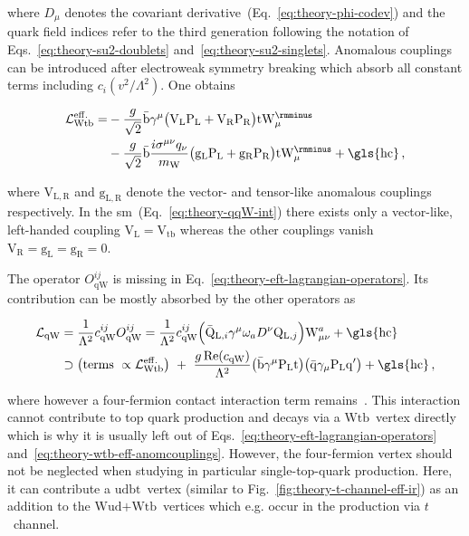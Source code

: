 where $D_\mu$ denotes the covariant derivative~(Eq.~\ref{eq:theory-phi-codev}) and the quark field indices refer to the third generation following the notation of Eqs.~\ref{eq:theory-su2-doublets} and~\ref{eq:theory-su2-singlets}. Anomalous couplings can be introduced after electroweak symmetry breaking which absorb all constant terms including $c_{i}(v^2/\Lambda^2)$. One obtains

\begin{align}
\mathcal{L}^\mathrm{eff.}_\mathrm{Wtb}=&-\frac{g}{\sqrt{2}}\bar{\mathrm{b}}\gamma^{\mu}\big(\mathrm{V}_\mathrm{L}\mathrm{P}_\mathrm{L}+\mathrm{V}_\mathrm{R}\mathrm{P}_\mathrm{R}\big)\mathrm{t}\mathrm{W}_\mu^{\rmminus}\nonumber\\
&-\frac{g}{\sqrt{2}}\bar{\mathrm{b}}\frac{i\sigma^{\mu\nu}q_\nu}{m_\mathrm{W}}\big(\mathrm{g}_\mathrm{L}\mathrm{P}_\mathrm{L}+\mathrm{g}_\mathrm{R}\mathrm{P}_\mathrm{R}\big)\mathrm{t}\mathrm{W}_\mu^{\rmminus}+\mathrm{\gls{hc}}\,,\label{eq:theory-wtb-eff-anomcouplings}
\end{align}

where $\mathrm{V}_\mathrm{L,R}$ and $\mathrm{g}_\mathrm{L,R}$ denote the vector- and tensor-like anomalous couplings respectively. In the \gls{sm}~(Eq.~\ref{eq:theory-qqW-int}) there exists only a vector-like, left-handed coupling $\mathrm{V}_\mathrm{L}=\mathrm{V}_\mathrm{tb}$ whereas the other couplings vanish $\mathrm{V}_\mathrm{R}=\mathrm{g}_\mathrm{L}=\mathrm{g}_\mathrm{R}=0$.

The operator $O_\mathrm{qW}^{ij}$ is missing in Eq.~\ref{eq:theory-eft-lagrangian-operators}. Its contribution can be mostly absorbed by the other operators as

\begin{align}
\mathcal{L}_\mathrm{qW}&=\frac{1}{\Lambda^2}c^{ij}_\mathrm{qW}O_\mathrm{qW}^{ij}=\frac{1}{\Lambda^2}c^{ij}_\mathrm{qW}\Big(\bar{\mathrm{Q}}_{\mathrm{L},i}\gamma^{\mu}\omega_{a}D^\nu\mathrm{Q}_{\mathrm{L},j}\Big)\mathrm{W}_{\mu\nu}^{a}+\mathrm{\gls{hc}}\nonumber\\
&\supset\big(\text{terms }\propto\mathcal{L}_\mathrm{Wtb}^\mathrm{eff.}\big)~+~\frac{g\,\mathrm{Re}(c_\mathrm{qW})}{\Lambda^2}\big(\bar{\mathrm{b}}\gamma^{\mu}\mathrm{P}_\mathrm{L}\mathrm{t}\big)\big(\bar{\mathrm{q}}\gamma_\mu\mathrm{P}_\mathrm{L}\mathrm{q}^\prime\big)+\mathrm{\gls{hc}}\,,\label{eq:theory-4q-eff-anomcouplings}
\end{align}

where however a four-fermion contact interaction term remains~\cite{Bach:2012fb}. This interaction cannot contribute to top quark production and decays via a $\mathrm{Wtb}$~vertex directly which is why it is usually left out of Eqs.~\ref{eq:theory-eft-lagrangian-operators} and~\ref{eq:theory-wtb-eff-anomcouplings}. However, the four-fermion vertex should not be neglected when studying in particular single-top-quark production. Here, it can contribute a $\mathrm{udbt}$~vertex (similar to Fig.~\ref{fig:theory-t-channel-eff-ir}) as an addition to the $\mathrm{Wud}\text{+}\mathrm{Wtb}$~vertices which e.g. occur in the production via $t$~channel.

